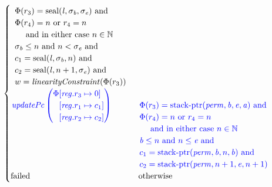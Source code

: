 \documentclass[a4paper]{article}
\newcommand{\tand}{\text{ and }}
\newcommand{\tor}{\text{ or }}
\newcommand{\totherwise}{\text{otherwise }}
\newcommand{\sourcecolor}{\color{blue}}
\newcommand{\nats}{\mathbb{N}}
\newcommand{\update}[2]{[#1 \mapsto #2]}
\newcommand{\updReg}[2]{\update{\reg.#1}{#2}}
\newcommand{\shareddom}[1]{\mathrm{#1}}
\newcommand{\perm}{\var{perm}}
\newcommand{\lin}{\var{l}}
\newcommand{\stkptr}[1]{\mathrm{stack\text{-}ptr}(#1)}
\newcommand{\seal}[1]{\shareddom{seal}(#1)}
\newcommand{\failed}{\mathrm{failed}}
\newcommand{\var}[1]{\mathit{#1}}
\newcommand{\reg}{\var{reg}}
\newcommand{\baddr}{\var{b}}
\newcommand{\eaddr}{\var{e}}
\newcommand{\aaddr}{\var{a}}
\newcommand{\plainfun}[2]{
  \ifthenelse{\equal{#2}{}}
  {\mathit{#1}}
  {\mathit{#1}(#2)}
}
\newcommand{\updPcAddr}[1]{\plainfun{updatePc}{#1}}
\newcommand{\linCons}[1]{\plainfun{linearityConstraint}{#1}}
\begin{document}
\begin{align*}
\begin{cases}
\begin{array}[t]{l}
                                   \Phi(r_3) = \seal{\lin,\sigma_\baddr,\sigma_\eaddr} \tand \\
                                   \Phi(r_4) = n \tor r_4 = n \\
                                   \quad\text{ and in either case } n \in \nats \\
                                   \sigma_\baddr \leq n \tand n < \sigma_\eaddr \tand \\
                                   c_1 = \seal{\lin,\sigma_\baddr,n} \tand \\
                                   c_2 = \seal{\lin,n+1,\sigma_\eaddr} \tand \\
                                   w = \linCons{\Phi(r_3)}
                                 \end{array}\\
                                   \sourcecolor\left.
                                   \updPcAddr{}\left(
                                   \arraycolsep=0pt
                                   \begin{array}{rl}
                                     \Phi&\updReg{r_3}{0}\\
                                               &\updReg{r_1}{c_1}\\
                                               &\updReg{r_2}{c_2}
                                   \end{array} \right)\right.
&
                                 \sourcecolor\left.
                                 \arraycolsep=0pt
                                 \begin{array}[t]{l}
                                   \Phi(r_3) = \stkptr{\perm,\baddr,\eaddr,\aaddr} \tand \\
                                   \Phi(r_4) = n \tor r_4 = n \\
                                   \quad\text{ and in either case } n \in \nats \\
                                   \baddr \leq n \tand n \leq \eaddr \tand \\
                                   c_1 = \stkptr{\perm,\baddr,n,\baddr} \tand \\
                                   c_2 = \stkptr{\perm,n+1,\eaddr,n+1} 
                                 \end{array} \right.\\
                                 \failed & \totherwise
                               \end{cases}
\end{align*}
\end{document}

